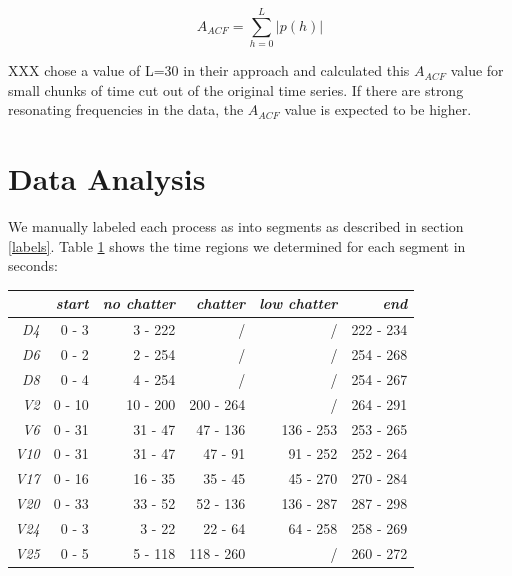 \documentclass[12 pt]{scrartcl}
\begin{document}
\[ A_{ACF} = \sum^{L}_{h=0}{|p(h)|} \]

XXX chose a value of L=30 in their approach and calculated this $A_{ACF}$ value for small chunks of time cut out of the original time series.
If there are strong resonating frequencies in the data, the $A_{ACF}$ value is expected to be higher.

\section{Data Analysis}

We manually labeled each process as into segments as described in section \ref{labels}. Table \ref{tab:segmenttime} shows the time regions we determined for each segment in seconds:

\begin{table}[ht]
  \centering
  \label{tab:segmenttime}
  \begin{tabular}{r|rrrrr}
               & \emph{start} & \emph{no chatter} & \emph{chatter} & \emph{low chatter} & \emph{end} \\
    \hline
    \emph{D4}  & 0 - 3        & 3  - 222          & /              & /                  & 222 - 234  \\
    \emph{D6}  & 0 - 2        & 2  - 254          & /              & /                  & 254 - 268  \\
    \emph{D8}  & 0 - 4        & 4  - 254          & /              & /                  & 254 - 267  \\
    \emph{V2}  & 0 - 10       & 10 - 200          & 200 - 264      & /                  & 264 - 291  \\
    \emph{V6}  & 0 - 31       & 31 - 47           & 47  - 136      & 136 - 253          & 253 - 265  \\
    \emph{V10} & 0 - 31       & 31 - 47           & 47  - 91       & 91  - 252          & 252 - 264  \\
    \emph{V17} & 0 - 16       & 16 - 35           & 35  - 45       & 45  - 270          & 270 - 284  \\
    \emph{V20} & 0 - 33       & 33 - 52           & 52  - 136      & 136 - 287          & 287 - 298  \\
    \emph{V24} & 0 - 3        & 3  - 22           & 22  - 64       & 64  - 258          & 258 - 269  \\
    \emph{V25} & 0 - 5        & 5  - 118          & 118 - 260      & /                  & 260 - 272  \\
  \end{tabular}
\end{table}
\end{document}
